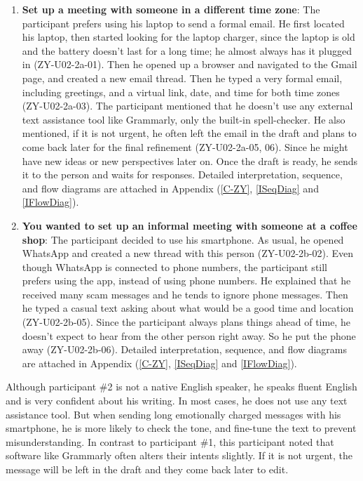 \documentclass[acmsmall,screen,authorversion,nonacm]{acmart}
\begin{document}
\begin{center}
\begin{enumerate}
    \item \textbf{Set up a meeting with someone in a different time zone}: The participant prefers using his laptop to send a formal email. He first located his laptop, then started looking for the laptop charger, since the laptop is old and the battery doesn’t last for a long time; he almost always has it plugged in (ZY-U02-2a-01). Then he opened up a browser and navigated to the Gmail page, and created a new email thread. Then he typed a very formal email, including greetings, and a virtual link, date, and time for both time zones (ZY-U02-2a-03). The participant mentioned that he doesn’t use any external text assistance tool like Grammarly, only the built-in spell-checker. He also mentioned, if it is not urgent, he often left the email in the draft and plans to come back later for the final refinement (ZY-U02-2a-05, 06). Since he might have new ideas or new perspectives later on. Once the draft is ready, he sends it to the person and waits for responses. Detailed interpretation, sequence, and flow diagrams are attached in Appendix (\ref{C-ZY}, \ref{ISeqDiag} and \ref{IFlowDiag}). 
    
    \item \textbf{You wanted to set up an informal meeting with someone at a coffee shop}: The participant decided to use his smartphone. As usual, he opened WhatsApp and created a new thread with this person (ZY-U02-2b-02). Even though WhatsApp is connected to phone numbers, the participant still prefers using the app, instead of using phone numbers. He explained that he received many scam messages and he tends to ignore phone messages. Then he typed a casual text asking about what would be a good time and location (ZY-U02-2b-05). Since the participant always plans things ahead of time, he doesn’t expect to hear from the other person right away. So he put the phone away (ZY-U02-2b-06). Detailed interpretation, sequence, and flow diagrams are attached in Appendix (\ref{C-ZY}, \ref{ISeqDiag} and \ref{IFlowDiag}). 
\end{enumerate}
\end{center}

Although participant \#2 is not a native English speaker, he speaks fluent English and is very confident about his writing. In most cases, he does not use any text assistance tool. But when sending long emotionally charged messages with his smartphone, he is more likely to check the tone, and fine-tune the text to prevent misunderstanding. In contrast to participant \#1, this participant noted that software like Grammarly often alters their intents slightly. If it is not urgent, the message will be left in the draft and they come back later to edit. 
\end{document}
